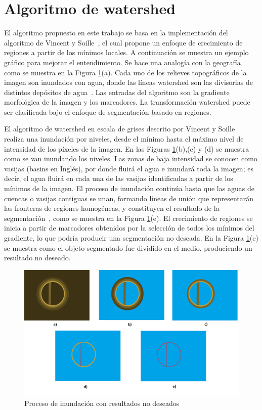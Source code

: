 \section{Algoritmo de watershed}
\label{chap:marco}

El algoritmo propuesto en este trabajo se basa en la implementación del algoritmo de Vincent y Soille~\cite{VincentSoille}, el cual propone un enfoque de crecimiento de regiones a partir de los mínimos locales. A continuación se muestra un ejemplo gráfico para mejorar el entendimiento. Se hace una analogía con la geografía como se muestra en la Figura \ref{img:relieve}(a). Cada uno de los relieves topográficos de la imagen son inundados con agua, donde las líneas watershed son las divisorias de distintos depósitos de agua~\cite{parwashed}. Las entradas del algoritmo son la gradiente morfológica de la imagen y los marcadores. La transformación watershed puede ser clasificada bajo el enfoque de segmentación basado en regiones. 

El algoritmo de watershed en escala de grises descrito por Vincent y Soille~\cite{VincentSoille} realiza una inundación por niveles, desde el mínimo hasta el máximo nivel de intensidad de los píxeles de la imagen. En las Figuras \ref{img:relieve}(b),(c) y (d) se muestra como se van inundando los niveles. Las zonas de baja intensidad se conocen como vasijas (basins en Inglés), por donde fluirá el agua e inundará toda la imagen; es decir, el agua fluirá en cada una de las vasijas identificadas a partir de los mínimos de la imagen. El proceso de inundación continúa hasta que las aguas de cuencas o vasijas contiguas se unan, formando líneas de unión que representarán las fronteras de regiones homogéneas, y constituyen el resultado de la segmentación~\cite{parwashed}, como se muestra en la Figura \ref{img:relieve}(e). El crecimiento de regiones se inicia a partir de marcadores obtenidos por la selección de todos los mínimos del gradiente, lo que podría producir una segmentación no deseada. En la Figura \ref{img:relieve}(e) se muestra como el objeto segmentado fue dividido en el medio, produciendo un resultado no deseado.
\begin{figure}[H]
\centering
\includegraphics[width=150mm]{./imagenes/sin_marcadores.png}
\caption{Proceso de inundación con resultados no deseados}
\label{img:relieve}
\end{figure}

